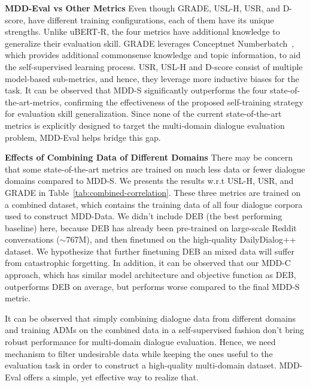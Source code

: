 \documentclass[letterpaper]{article} \usepackage{aaai22}  \usepackage{times}  \usepackage{helvet}  \usepackage{courier}  \usepackage[hyphens]{url}  \usepackage{graphicx} \urlstyle{rm} \def\UrlFont{\rm}  \usepackage{natbib}  \usepackage{caption} \DeclareCaptionStyle{ruled}{labelfont=normalfont,labelsep=colon,strut=off} \frenchspacing  \setlength{\pdfpagewidth}{8.5in}  \setlength{\pdfpageheight}{11in}  \usepackage{algorithm}
\begin{document}
\bigskip
\noindent\textbf{MDD-Eval vs Other Metrics } Even though GRADE, USL-H, USR, and D-score, have different training configurations, each of them have its unique strengths. Unlike uBERT-R, the four metrics have additional knowledge to generalize their evaluation skill. GRADE leverages Conceptnet Numberbatch~\citep{speer2017conceptnet}, which provides additional commonsense knowledge and topic information, to aid the self-supervised learning process. USR, USL-H and D-score consist of multiple model-based sub-metrics, and hence, they leverage more inductive biases for the task. It can be observed that MDD-S significantly outperforms the four state-of-the-art-metrics, confirming the effectiveness of the proposed self-training strategy for evaluation skill generalization. Since none of the current state-of-the-art metrics is explicitly designed to target the multi-domain dialogue evaluation problem, MDD-Eval helps bridge this gap.  

\bigskip
\noindent\textbf{Effects of Combining Data of Different Domains }There may be concern that some state-of-the-art metrics are trained on much less data or fewer dialogue domains compared to MDD-S. We presents the results w.r.t USL-H, USR, and GRADE in Table~\ref{tab:combined-correlation}. These three metrics are trained on a combined dataset, which contains the training data of all four dialogue corpora used to construct MDD-Data. We didn't include DEB (the best performing baseline) here, because DEB has already been pre-trained on large-scale Reddit conversations ($\sim$767M), and then finetuned on the high-quality DailyDialog++ dataset. We hypothesize that further finetuning DEB an mixed data will suffer from catastrophic forgetting. In addition, it can be observed that our MDD-C approach, which has similar model architecture and objective function as DEB, outperforms DEB on average, but performs worse compared to the final MDD-S metric. 

 It can be observed that simply combining dialogue data from different domains and training ADMs on the combined data in a self-supervised fashion don't bring robust performance for multi-domain dialogue evaluation. Hence, we need mechanism to filter undesirable data while keeping the ones useful to the evaluation task in order to construct a high-quality multi-domain dataset. MDD-Eval offers a simple, yet effective way to realize that.   
\end{document}
